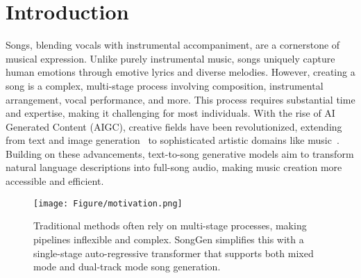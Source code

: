 \section{Introduction}

Songs, blending vocals with instrumental accompaniment, are a cornerstone of musical expression. Unlike purely instrumental music, songs uniquely capture human emotions through emotive lyrics and diverse melodies. However, creating a song is a complex, multi-stage process involving composition, instrumental arrangement, vocal performance, and more. This process requires substantial time and expertise, making it challenging for most individuals.
With the rise of AI Generated Content (AIGC), creative fields have been revolutionized, extending from text and image generation~\cite{rombach2022high, zhang2023adding,achiam2023gpt} to sophisticated artistic domains like music~\cite{huang2018music, dhariwal2020jukebox,ji2020comprehensive}. Building on these advancements, text-to-song generative models aim to transform natural language descriptions into full-song audio, making music creation more accessible and efficient.




\begin{figure}[tb!]
	\centering
	\texttt{[image: Figure/motivation.png]}
    \vspace{-10pt}
	\caption{
    Traditional methods often rely on multi-stage processes, making pipelines inflexible and complex. SongGen simplifies this with a single-stage auto-regressive transformer that supports both mixed mode and dual-track mode song generation.
    }
	\label{fig:motivation}
    \vspace{-10pt}
\end{figure}

